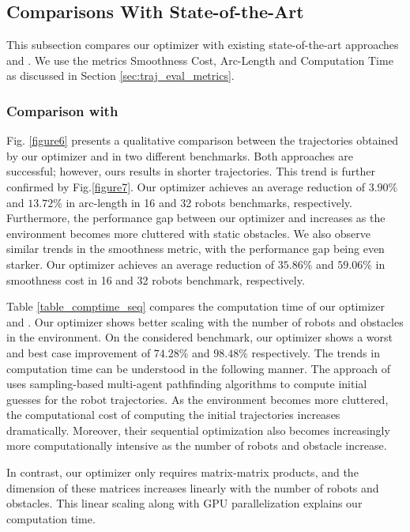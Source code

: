\subsection{Comparisons With State-of-the-Art}

\noindent This subsection compares our optimizer with existing state-of-the-art approaches \citep{aks_ral21} and \citep{park2020efficient}. We use the metrics Smoothness Cost, Arc-Length and Computation Time as discussed in Section \ref{sec:traj_eval_metrics}.


\subsubsection{Comparison with \citep{park2020efficient}}
Fig. \ref{figure6} presents a qualitative comparison between the trajectories obtained by our optimizer and \citep{park2020efficient} in two different benchmarks. Both approaches are successful; however, ours results in shorter trajectories. This trend is further confirmed by Fig.\ref{figure7}. Our optimizer achieves an average reduction of $3.90\%$ and $13.72\%$ in arc-length in 16 and 32 robots benchmarks, respectively. Furthermore, the performance gap between our optimizer and \citep{park2020efficient} increases as the environment becomes more cluttered with static obstacles. We also observe similar trends in the smoothness metric, with the performance gap being even starker. Our optimizer achieves an average reduction of $35.86\%$ and $59.06\%$ in smoothness cost in 16 and 32 robots benchmark, respectively.


Table \ref{table_comptime_seq} compares the computation time of our optimizer and \citep{park2020efficient}. Our optimizer shows better scaling with the number of robots and obstacles in the environment. On the considered benchmark, our optimizer shows a worst and best case improvement of $74.28 \%$ and $98.48 \%$ respectively. The trends in computation time can be understood in the following manner. The approach of \citep{park2020efficient} uses sampling-based multi-agent pathfinding algorithms to compute initial guesses for the robot trajectories. As the environment becomes more cluttered, the computational cost of computing the initial trajectories increases dramatically. Moreover, their sequential optimization also becomes increasingly more computationally intensive as the number of robots and obstacle increase. 

In contrast, our optimizer only requires matrix-matrix products, and the dimension of these matrices increases linearly with the number of robots and obstacles. This linear scaling along with GPU parallelization explains our computation time. 

